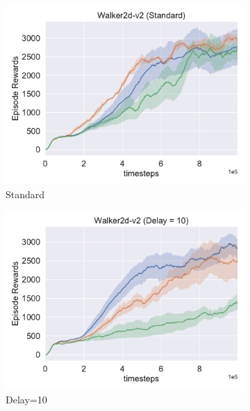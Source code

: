 \begin{figure}[h!]
\centering
  \begin{subfigure}[t]{0.49\textwidth}
    \includegraphics[width=\textwidth]{figures/chapter5/multi_frames/delay1.pdf}
    \caption{Standard}
  \end{subfigure}\hfill
  \begin{subfigure}[t]{0.49\textwidth}
    \includegraphics[width=\textwidth]{figures/chapter5/multi_frames/delay10.pdf}
    \caption{Delay=10}
  \end{subfigure}\hfill
  \begin{subfigure}[t]{0.49\textwidth}

\end{subfigure}
\end{figure}
